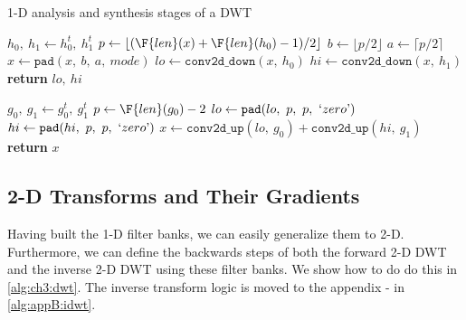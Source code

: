 \begin{algorithm}[tb]
\caption{1-D analysis and synthesis stages of a DWT}\label{alg:ch3:fb1d}
\begin{algorithmic}[1]
  \label{alg:ch3:afb1d}
    \State $h_0,\ h_1 \gets h_0^t,\ h_1^t$  
  \EndIf
  \State $p \gets \lfloor (\F{len}(x) + \F{len}(h_0) - 1) / 2 \rfloor$ 
  \State $b \gets \lfloor p/2 \rfloor$ 
  \State $a \gets \lceil p/2 \rceil$ 
  \State $x \gets \mathtt{pad}(x,\ b,\ a,\ mode)$ 
  \State $lo \gets \mathtt{conv2d\_down} (x,\ h_0)$
  \State $hi \gets \mathtt{conv2d\_down} (x,\ h_1)$
  \State \textbf{return} $lo,\ hi$
\EndFunction
\end{algorithmic}\vspace{10pt}
\begin{algorithmic}[1]
  \label{alg:ch3:sfb1d}
    \State $g_0,\ g_1 \gets g_0^t,\ g_1^t$  
  \EndIf
  \State $p \gets \F{len}(g_0) - 2$ 
  \State $lo \gets \mathtt{pad}(lo,\ p,\ p,\ `zero \textrm')$ 
  \State $hi \gets \mathtt{pad}(hi,\ p,\ p,\ `zero \textrm')$ 
  \State $x \gets \mathtt{conv2d\_up}(lo,\ g_0) + \mathtt{conv2d\_up}(hi,\ g_1)$
  \State \textbf{return} $x$
\EndFunction
\end{algorithmic}
\end{algorithm}

\subsection{2-D Transforms and Their Gradients}\label{sec:ch3:2d_dwt}
Having built the 1-D filter banks, we can easily generalize them to 2-D.
Furthermore, we can define the backwards steps of both the forward 2-D DWT
and the inverse 2-D DWT using these filter banks. We show how to do do this in
\autoref{alg:ch3:dwt}. The inverse transform logic is moved to the appendix - in
\autoref{alg:appB:idwt}.

